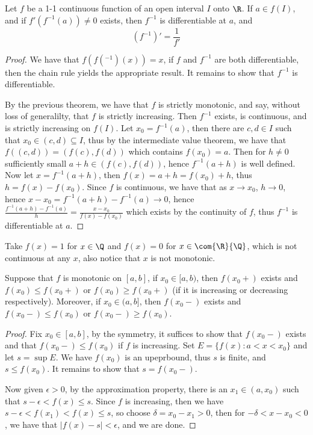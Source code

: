 \begin{theorem}\label{4.4.3}
    Let $f$ be a 1-1 continuous function of an open interval  $I$ onto  $\R$. If  $a \in f(I)$, 
    and if  $f'(f^{-1}(a)) \neq 0$ exists, then  $f^{-1}$ is differentiable at $a$, and 
        \begin{equation}
            (f^{-1})'=\frac{1}{f'}
        \end{equation} 
\end{theorem}
\begin{proof}
    We have that $f(f(^{-1})(x))=x$, if $f$ and $f^{-1}$ are both differentiable, then 
    the chain rule yields the appropriate result. It remains to show that  $f^{-1}$ is 
    differentiable.

    By the previous theorem, we have that  $f$ is strictly monotonic, and say, without 
    loss of generalilty, that  $f$ is strictly increasing. Then  $f^{-1}$ exists, is continuous, and 
    is strictly increasing on $f(I)$. Let  $x_0=f^{-1}(a)$, then there are $c,d \in I$ such that 
    $x_0 \in (c,d) \subseteq I$, thus by the intermediate value theorem, we have that  $f((c,d))=(f(c),f(d))$ which 
    contains  $f(x_0)=a$. Then for $h \neq 0$ sufficiently small  $a+h \in (f(c),f(d))$, 
    hence $f^{-1}(a+h)$ is well defined. Now let  $x=f^{-1}(a+h)$, then  $f(x)=a+h=f(x_0)+h$, 
    thus $h=f(x)-f(x_0)$. Since $f$ is continuous, we have that as  $x \rightarrow x_0$, $h \rightarrow 0$, 
    hence  $x-x_0=f^{-1}(a+h)-f^{-1}(a) \rightarrow 0$, hence $\frac{f^{-1}(a+h)-f^{-1}(a)}{h}=
    \frac{x-x_0}{f(x)-f(x_0)}$ which exists by the continuity of $f$, thus  $f^{-1}$ is differentiable at  $a$.
\end{proof}

\begin{example}
    Take $f(x)=1$ for  $x \in \Q$ and  $f(x)=0$ for  $x \in \com{\R}{\Q}$, which is not 
    continuous at any $x$, also notice that  $x$ is not monotonic.
\end{example}

\begin{lemma}\label{4.4.4}
    Suppose that $f$ is monotonic on  $[a,b]$, if  $x_0 \in [a,b)$, then $f(x_0+)$ exists and 
    $f(x_0) \leq f(x_0+)$ or $f(x_0) \geq f(x_0+)$ (if it is increasing or decreasing respectively). Moreover, 
    if $x_0 \in (a,b]$, then $f(x_0-)$ exists and $f(x_0-) \leq f(x_0)$ or $f(x_0-) \geq f(x_0)$.
\end{lemma}
\begin{proof}
    Fix $x_0 \in [a,b]$, by the symmetry, it suffices to show that $f(x_0-)$ exists and that 
    $f(x_0-) \leq f(x_0)$ if $f$ is increasing. Set  $E=\{f(x):a<x<x_0\}$ and let $s=\sup{E}$. We have 
    $f (x_0)$ is an upeprbound, thus $s$ is finite, and  $s \leq f(x_0)$. It remains to show that $s=f(x_0-)$.

    Now given $\epsilon>0$, by the approximation property, there is an $x_1 \in (a,x_0)$ such that 
    $s-\epsilon<f(x) \leq s$. Since  $f$ is increasing, then we have  $s-\epsilon<f(x_1)<f(x) \leq s$, so 
    choose $\delta=x_0-x_1>0$, then for $-\delta<x-x_0<0$, we have that $|f(x)-s|<\epsilon$, and we are 
    done.
\end{proof}

